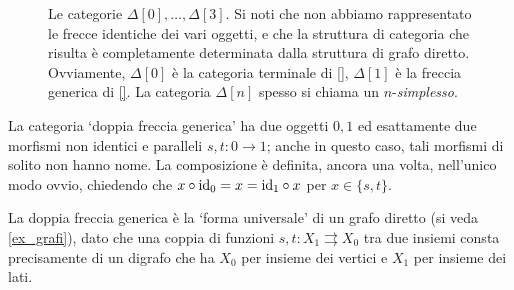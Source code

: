 \begin{example}
\begin{figure}[h]
\begin{center}
		\end{center}
			\caption{Le categorie $\Delta[0], \dots,\Delta[3]$. Si noti che non abbiamo rappresentato le frecce identiche dei vari oggetti, e che la struttura di categoria che risulta è completamente determinata dalla struttura di grafo diretto. Ovviamente, $\Delta[0]$ è la categoria terminale di \ref{}, $\Delta[1]$ è la freccia generica di \ref{}. La categoria $\Delta[n]$ spesso si chiama un $n$-\emph{simplesso}.}
	\end{figure}
\end{example}
\begin{example}\label{ex_cat_doppiafreccia}
	La categoria `doppia freccia generica' ha due oggetti $0,1$ ed esattamente due morfismi non identici e paralleli $s,t : 0\to 1$; anche in questo caso, tali morfismi di solito non hanno nome. La composizione è definita, ancora una volta, nell'unico modo ovvio, chiedendo che $x\circ \mathrm{id}_0=x=\mathrm{id}_1\circ x$ per $x\in\{s,t\}$.

	La doppia freccia generica è la `forma universale' di un grafo diretto (si veda \ref{ex_grafi}), dato che una coppia di funzioni $s,t: X_1 \rightrightarrows X_0$ tra due insiemi consta precisamente di un digrafo che ha $X_0$ per insieme dei vertici e $X_1$ per insieme dei lati.
\end{example}
